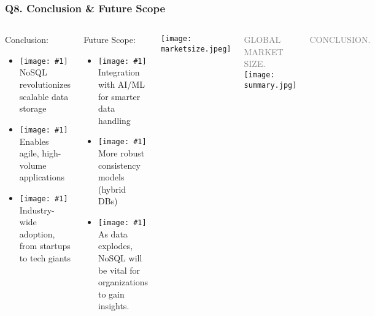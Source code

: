 \documentclass{beamer}
\newcommand{\icon}[1]{\texttt{[image: \#1]}}
\begin{document}
\begin{frame}
\frametitle{Q8. Conclusion \& Future Scope}
\vspace{-0.3cm}
\begin{columns}
    \begin{block}{Conclusion:}
    \begin{itemize}
        \item \icon{check-mark.png} NoSQL revolutionizes scalable data storage
        \item \icon{check-mark.png} Enables agile, high-volume applications
        \item \icon{check-mark.png} Industry-wide adoption, from startups to tech giants
    \end{itemize}
    \end{block}
    \vspace{-0.1cm}
    \begin{block}{Future Scope:}
    \begin{itemize}
        \item \icon{check-mark.png} Integration with AI/ML for smarter data handling
        \item \icon{check-mark.png} More robust consistency models (hybrid DBs)
        \item \icon{check-mark.png} As data explodes, NoSQL will be vital for organizations to gain insights.
    \end{itemize}
    \end{block}
    \centering
    \texttt{[image: marketsize.jpeg]}\\
    \par\scriptsize\textcolor{gray}{GLOBAL MARKET SIZE.}\vspace{0.3cm}
    \texttt{[image: summary.jpg]}
    \par\scriptsize\textcolor{gray}{CONCLUSION.}
\end{columns}
\end{frame}
\end{document}
